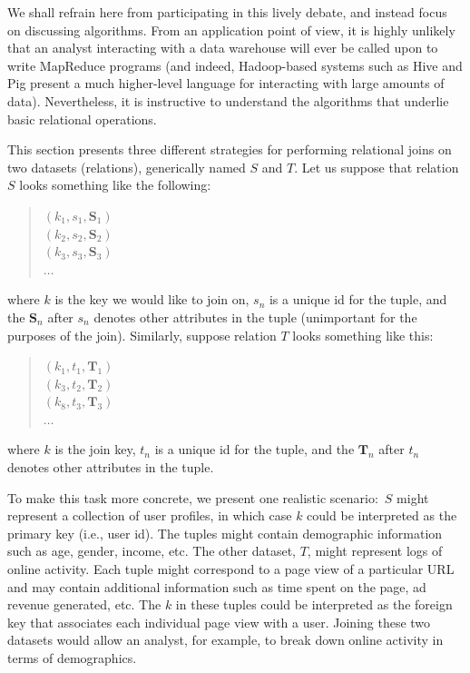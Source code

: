 We shall refrain here from participating in this lively debate, and
instead focus on discussing algorithms.  From an application point of
view, it is highly unlikely that an analyst interacting with a data
warehouse will ever be called upon to write MapReduce programs (and
indeed, Hadoop-based systems such as Hive and Pig present a much
higher-level language for interacting with large amounts of data).
Nevertheless, it is instructive to understand the algorithms that
underlie basic relational operations.

This section presents three different strategies for performing
relational joins on two datasets (relations), generically named $S$
and $T$.  Let us suppose that relation $S$ looks something like the
following:

\begin{quote}
$(k_1, s_1, \textbf{S}_1)$ \\
$(k_2, s_2, \textbf{S}_2)$ \\
$(k_3, s_3, \textbf{S}_3)$ \\
$\ldots$
\end{quote}

\noindent where $k$ is the key we would like to join on, $s_n$ is a
unique id for the tuple, and the $\textbf{S}_n$ after $s_n$ denotes
other attributes in the tuple (unimportant for the purposes of the
join).  Similarly, suppose relation $T$ looks something like this:

\begin{quote}
$(k_1, t_1, \textbf{T}_1)$ \\
$(k_3, t_2, \textbf{T}_2)$ \\
$(k_8, t_3, \textbf{T}_3)$ \\
$\ldots$
\end{quote}

\noindent where $k$ is the join key, $t_n$ is a unique id for the
tuple, and the $\textbf{T}_n$ after $t_n$ denotes other attributes in the
tuple.  

To make this task more concrete, we present one realistic
scenario:\ $S$ might represent a collection of user profiles, in which
case $k$ could be interpreted as the primary key (i.e., user id).  The
tuples might contain demographic information such as age, gender,
income, etc.  The other dataset, $T$, might represent logs of online
activity.  Each tuple might correspond to a page view of a particular
URL and may contain additional information such as time spent on the
page, ad revenue generated, etc.  The $k$ in these tuples could be
interpreted as the foreign key that associates each individual page
view with a user.  Joining these two datasets would allow an analyst,
for example, to break down online activity in terms of demographics.

